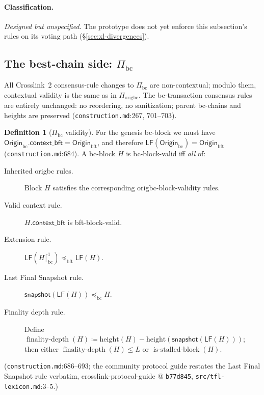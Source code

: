 \documentclass[11pt,a4paper]{article}
\theoremstyle{definition}
\newtheorem{definition}[theorem]{Definition}
\begin{document}
\paragraph{Classification.} \emph{Designed but unspecified}. The
prototype does not yet enforce this subsection's rules on its voting path
(\S\ref{sec:xl-divergences}).

\subsection{The best-chain side:
\texorpdfstring{$\Pi_{\mathrm{bc}}$}{Pi-bc}}\label{sec:xl-bc}

All Crosslink~2 consensus-rule changes to $\Pi_{\mathrm{bc}}$ are
non-contextual; modulo them, contextual validity is the same as in
$\Pi_{\mathrm{origbc}}$. The bc-transaction consensus rules are entirely
unchanged: no reordering, no sanitization; parent bc-chains and heights
are preserved (\texttt{construction.md}:267, 701--703).

\begin{definition}[$\Pi_{\mathrm{bc}}$ validity]\label{def:xl-bc-validity}
For the genesis bc-block we must have
$\mathsf{Origin}_{\mathrm{bc}}.\mathsf{context\_bft} =
\mathsf{Origin}_{\mathrm{bft}}$, and therefore
$\mathsf{LF}(\mathsf{Origin}_{\mathrm{bc}}) =
\mathsf{Origin}_{\mathrm{bft}}$ (\texttt{construction.md}:684). A
bc-block $H$ is bc-block-valid iff \emph{all} of:
\begin{description}
\item[Inherited origbc rules.] Block $H$ satisfies the corresponding
  origbc-block-validity rules.
\item[Valid context rule.] $H.\mathsf{context\_bft}$ is bft-block-valid.
\item[Extension rule.] $\mathsf{LF}(H \lceil^{1}_{\mathrm{bc}})
  \preceq_{\mathrm{bft}} \mathsf{LF}(H)$.
\item[Last Final Snapshot rule.] $\mathsf{snapshot}(\mathsf{LF}(H))
  \preceq_{\mathrm{bc}} H$.
\item[Finality depth rule.] Define
  $\operatorname{finality\text{-}depth}(H) \coloneqq \mathrm{height}(H) -
  \mathrm{height}(\mathsf{snapshot}(\mathsf{LF}(H)))$; then either
  $\operatorname{finality\text{-}depth}(H) \le L$ or
  $\operatorname{is\text{-}stalled\text{-}block}(H)$.
\end{description}
(\texttt{construction.md}:686--693; the community protocol guide restates
the Last Final Snapshot rule verbatim, crosslink-protocol-guide @
\texttt{b77d845}, \texttt{src/tfl-lexicon.md}:3--5.)
\end{definition}
\end{document}
